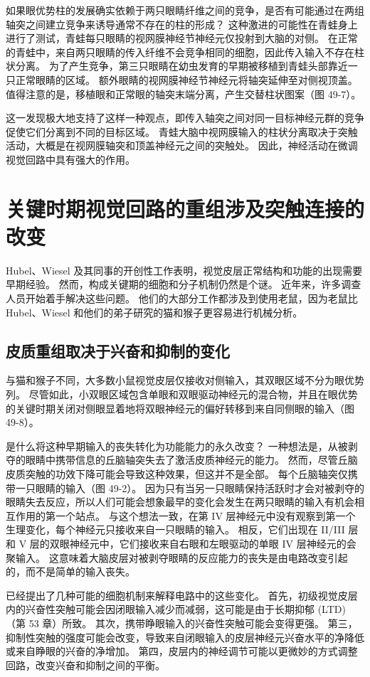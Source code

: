 如果眼优势柱的发展确实依赖于两只眼睛纤维之间的竞争，是否有可能通过在两组轴突之间建立竞争来诱导通常不存在的柱的形成？ 这种激进的可能性在青蛙身上进行了测试，青蛙每只眼睛的视网膜神经节神经元仅投射到大脑的对侧。 在正常的青蛙中，来自两只眼睛的传入纤维不会竞争相同的细胞，因此传入输入不存在柱状分离。 为了产生竞争，第三只眼睛在幼虫发育的早期被移植到青蛙头部靠近一只正常眼睛的区域。 额外眼睛的视网膜神经节神经元将轴突延伸至对侧视顶盖。 值得注意的是，移植眼和正常眼的轴突末端分离，产生交替柱状图案（图 49-7）。

这一发现极大地支持了这样一种观点，即传入轴突之间对同一目标神经元群的竞争促使它们分离到不同的目标区域。 青蛙大脑中视网膜输入的柱状分离取决于突触活动，大概是在视网膜轴突和顶盖神经元之间的突触处。 因此，神经活动在微调视觉回路中具有强大的作用。


\section{关键时期视觉回路的重组涉及突触连接的改变}
Hubel、Wiesel 及其同事的开创性工作表明，视觉皮层正常结构和功能的出现需要早期经验。 然而，构成关键期的细胞和分子机制仍然是个谜。 近年来，许多调查人员开始着手解决这些问题。 他们的大部分工作都涉及到使用老鼠，因为老鼠比 Hubel、Wiesel 和他们的弟子研究的猫和猴子更容易进行机械分析。

\subsection{皮质重组取决于兴奋和抑制的变化}
与猫和猴子不同，大多数小鼠视觉皮层仅接收对侧输入，其双眼区域不分为眼优势列。 尽管如此，小双眼区域包含单眼和双眼驱动神经元的混合物，并且在眼优势的关键时期关闭对侧眼显着地将双眼神经元的偏好转移到来自同侧眼的输入（图 49-8）。

是什么将这种早期输入的丧失转化为功能能力的永久改变？ 一种想法是，从被剥夺的眼睛中携带信息的丘脑轴突失去了激活皮质神经元的能力。 然而，尽管丘脑皮质突触的功效下降可能会导致这种效果，但这并不是全部。 每个丘脑轴突仅携带一只眼睛的输入（图 49-2）。 因为只有当另一只眼睛保持活跃时才会对被剥夺的眼睛失去反应，所以人们可能会想象最早的变化会发生在两只眼睛的输入有机会相互作用的第一个站点。 与这个想法一致，在第 IV 层神经元中没有观察到第一个生理变化，每个神经元只接收来自一只眼睛的输入。 相反，它们出现在 II/III 层和 V 层的双眼神经元中，它们接收来自右眼和左眼驱动的单眼 IV 层神经元的会聚输入。 这意味着大脑皮层对被剥夺眼睛的反应能力的丧失是由电路改变引起的，而不是简单的输入丧失。

已经提出了几种可能的细胞机制来解释电路中的这些变化。 首先，初级视觉皮层内的兴奋性突触可能会因闭眼输入减少而减弱，这可能是由于长期抑郁 (LTD)（第 53 章）所致。 其次，携带睁眼输入的兴奋性突触可能会变得更强。 第三，抑制性突触的强度可能会改变，导致来自闭眼输入的皮层神经元兴奋水平的净降低或来自睁眼的兴奋的净增加。 第四，皮层内的神经调节可能以更微妙的方式调整回路，改变兴奋和抑制之间的平衡。

